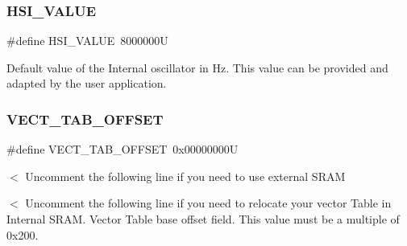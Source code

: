 \subsubsection{\texorpdfstring{HSI\_VALUE}{HSI\_VALUE}}
{\footnotesize\ttfamily \#define H\+S\+I\+\_\+\+V\+A\+L\+UE~8000000U}

Default value of the Internal oscillator in Hz. This value can be provided and adapted by the user application. \mbox{\label{group___s_t_m32_f1xx___system___private___defines_ga40e1495541cbb4acbe3f1819bd87a9fe}} 
\subsubsection{\texorpdfstring{VECT\_TAB\_OFFSET}{VECT\_TAB\_OFFSET}}
{\footnotesize\ttfamily \#define V\+E\+C\+T\+\_\+\+T\+A\+B\+\_\+\+O\+F\+F\+S\+ET~0x00000000U}

$<$ Uncomment the following line if you need to use external S\+R\+AM

$<$ Uncomment the following line if you need to relocate your vector Table in Internal S\+R\+AM. Vector Table base offset field. This value must be a multiple of 0x200. 